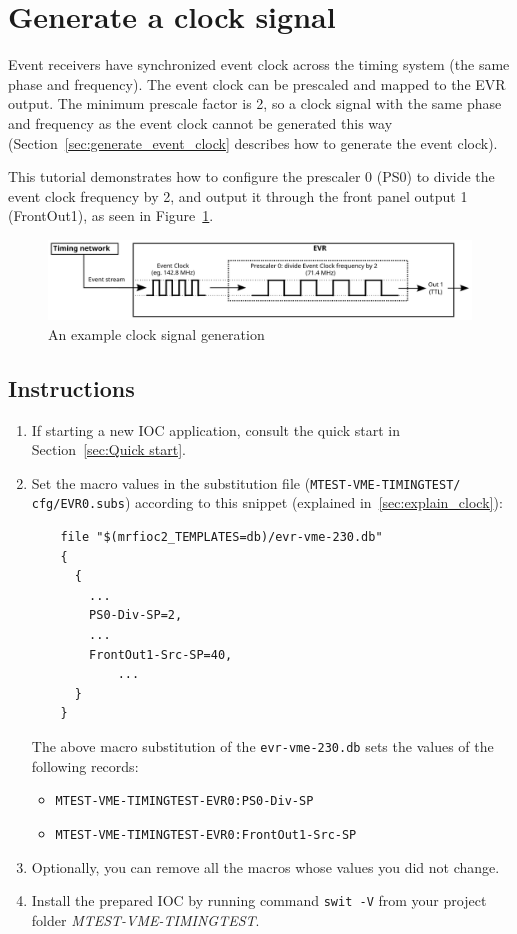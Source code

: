 \documentclass[12pt,a4paper]{article}
\begin{document}
\section{Generate a clock signal}

Event receivers have synchronized event clock across the timing system (the same phase and frequency). The event clock can be prescaled and mapped to the EVR output. The minimum prescale factor is 2, so a clock signal with the same phase and frequency as the event clock cannot be generated this way (Section~\ref{sec:generate_event_clock} describes how to generate the event clock).

This tutorial demonstrates how to configure the prescaler 0 (PS0) to divide the event clock frequency by 2, and output it through the front panel output 1 (FrontOut1), as seen in Figure~\ref{fig:prescaler}. 

\begin{figure}[H]
	\centering
	\includegraphics[width=\columnwidth]{./img/prescaler}
	\caption{An example clock signal generation}
	\label{fig:prescaler}
\end{figure}

\subsection{Instructions}
\begin{enumerate}
	\item If starting a new IOC application, consult the quick start in Section~\ref{sec:Quick start}.

	\item Set the macro values in the substitution file (\texttt{MTEST-VME-TIMINGTEST/} \texttt{cfg/EVR0.subs}) according to this snippet (explained in~\ref{sec:explain_clock}):
\begin{verbatim}
	file "$(mrfioc2_TEMPLATES=db)/evr-vme-230.db"
	{
	  {
	    ...
	    PS0-Div-SP=2,
	    ...
	    FrontOut1-Src-SP=40,
		    ...
	  }
	}
\end{verbatim}
	The above macro substitution of the \texttt{evr-vme-230.db} sets the values of the following records:
	\begin{itemize}
		\item \texttt{MTEST-VME-TIMINGTEST-EVR0:PS0-Div-SP}
		\item \texttt{MTEST-VME-TIMINGTEST-EVR0:FrontOut1-Src-SP}
	\end{itemize}
	
	\item Optionally, you can remove all the macros whose values you did not change. 
	\item Install the prepared IOC by running command \texttt{swit -V} from your project folder \textit{MTEST-VME-TIMINGTEST}.
\end{enumerate}
\end{document}
